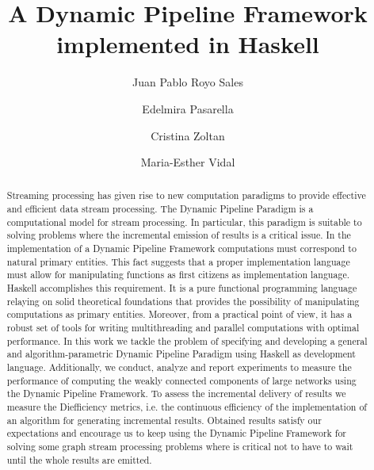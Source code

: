 \documentclass[preprint]{elsarticle}
\title{A Dynamic Pipeline Framework implemented in Haskell\tnoteref{t1}}
\author[1]{Juan Pablo Royo Sales}
\author[1]{Edelmira Pasarella}
\author[1]{Cristina Zoltan}
\author[2]{Maria-Esther Vidal}
\affiliation[1]{organization={Universitat Politècnica de Catalunya},
postcode={08034},
city={Barcelona},
country={Spain}}
\affiliation[2]{organization={TIB/L3S Research Centre at the University of Hannover},
city={Hannover},
country={Germany}}
\begin{document}
\begin{abstract}
Streaming processing has given rise to new computation paradigms to provide effective and efficient data stream processing. 
The Dynamic Pipeline Paradigm is a computational model for stream processing. In particular, this paradigm is suitable to solving problems where the incremental emission of results is a critical  issue. In the implementation of a Dynamic Pipeline Framework computations  must correspond to natural primary entities. This fact suggests that a proper im\-ple\-men\-ta\-tion language  must allow for manipulating functions  as first citizens as implementation language.  Haskell accomplishes this requirement. It is a pure functional programming language relaying on solid theoretical foundations that provides the possibility of manipulating computations as primary entities. Moreover, from a practical point of view, it has a robust set of tools for writing multithreading and parallel computations with optimal performance.  In this work we tackle the problem of specifying and developing a general and algorithm-parametric Dynamic Pipeline Paradigm using Haskell as development language. Additionally, we conduct, analyze and report experiments to measure the performance of computing the weakly connected components of large networks using the Dynamic Pipeline Framework.  To assess the incremental delivery of results we measure the Diefficiency metrics, i.e. the continuous efficiency of the implementation of an algorithm for generating incremental results. Obtained results satisfy our expectations and encourage us to keep using the Dynamic Pipeline Framework for solving some graph stream processing problems 
where is critical not to have to wait until the whole results are emitted. 


\end{abstract}
\end{document}
